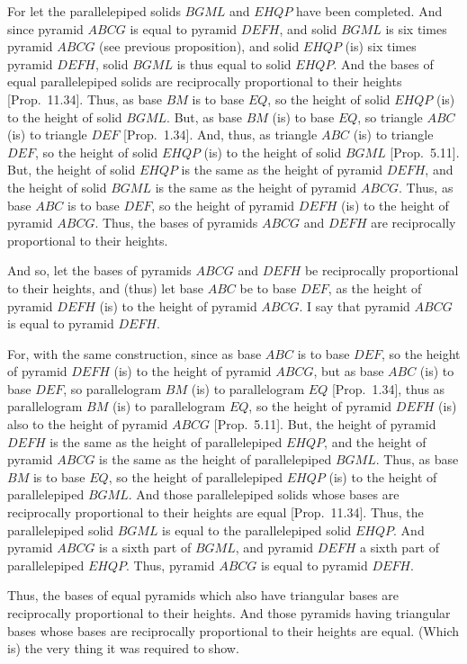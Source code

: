 For let the parallelepiped solids $BGML$ and $EHQP$ have been completed. And since pyramid
$ABCG$ is equal to pyramid $DEFH$, and solid $BGML$ is six times pyramid $ABCG$ (see previous
proposition), and solid $EHQP$ (is) six times pyramid $DEFH$, solid $BGML$ is thus equal to
solid $EHQP$. And the bases of equal parallelepiped solids are reciprocally proportional
to their heights [Prop.~11.34]. Thus, as base $BM$ is to base $EQ$, so the height of
solid $EHQP$ (is) to the height of solid $BGML$. But, as base $BM$ (is) to base $EQ$, so triangle
$ABC$ (is) to triangle $DEF$ [Prop.~1.34]. And, thus, as triangle $ABC$ (is) to triangle
$DEF$, so the height of solid $EHQP$ (is) to the height of solid $BGML$ [Prop.~5.11]. But, the height of
solid $EHQP$ is the same as the height of pyramid $DEFH$, and the height of solid $BGML$ is the
same as the height of pyramid $ABCG$. Thus, as base $ABC$ is to base $DEF$, so the
height of pyramid $DEFH$ (is) to the height of pyramid $ABCG$. Thus, the bases of pyramids
$ABCG$ and $DEFH$ are reciprocally proportional to their heights.

And so, let the bases of pyramids $ABCG$ and $DEFH$ be reciprocally proportional to their heights, and (thus) let
base $ABC$ be to base $DEF$, as the height of pyramid $DEFH$ (is) to the height of pyramid $ABCG$.
I say that pyramid $ABCG$ is equal to pyramid $DEFH$.

For, with the same construction, since as base $ABC$ is to base $DEF$, so the height of pyramid $DEFH$ (is)
to the height of pyramid $ABCG$, but as base $ABC$ (is) to base $DEF$, so parallelogram $BM$ (is)
to parallelogram $EQ$ [Prop.~1.34], thus as parallelogram $BM$ (is) to
parallelogram $EQ$, so the height of pyramid $DEFH$  (is) also to the height of pyramid $ABCG$ [Prop.~5.11]. But, 
the height of pyramid $DEFH$ is the same as the height of parallelepiped $EHQP$, and the height of
pyramid $ABCG$ is the same as the height of parallelepiped $BGML$. Thus, as base $BM$ is to
base $EQ$, so the height of parallelepiped $EHQP$ (is) to the height of parallelepiped $BGML$.
And those parallelepiped solids whose bases are reciprocally proportional to their
heights are equal [Prop.~11.34]. Thus, the parallelepiped solid $BGML$ is equal to the parallelepiped
solid $EHQP$. And pyramid $ABCG$ is a sixth part of $BGML$, and pyramid $DEFH$ a sixth part of
parallelepiped $EHQP$. Thus, pyramid $ABCG$ is equal to pyramid $DEFH$.

Thus,  the bases of equal pyramids which also have triangular bases are reciprocally
proportional to their heights. And those pyramids having triangular bases whose bases are reciprocally
proportional to their heights  are equal. (Which is) the very thing it was required to show.

